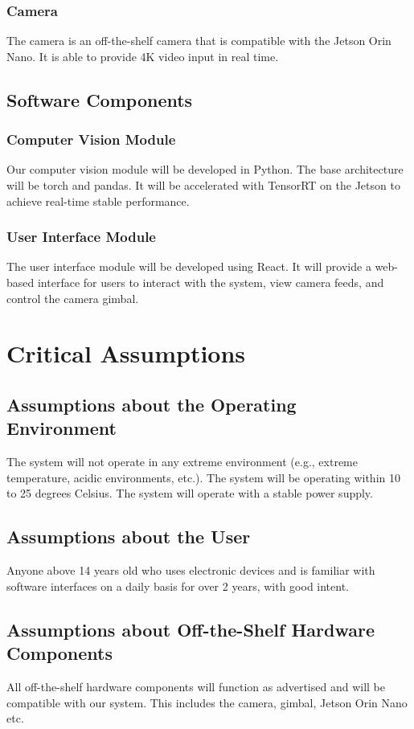 \documentclass{article}
\begin{document}
\subsubsection{Camera}
The camera is an off-the-shelf camera that is compatible with the Jetson Orin
Nano. It is able to provide 4K video input in real time.

\subsection{Software Components}
\subsubsection{Computer Vision Module}
Our computer vision module will be developed in Python. The base architecture
will be torch and pandas. It will be accelerated with TensorRT on the Jetson to
achieve real-time stable performance.
\subsubsection{User Interface Module}
The user interface module will be developed using React. It will provide a
web-based interface for users to interact with the system, view camera feeds,
and control the camera gimbal.

\section{Critical Assumptions}

\subsection{Assumptions about the Operating Environment}
The system will not operate in any extreme environment (e.g., extreme
temperature, acidic environments, etc.). The system will be operating within 10
to 25 degrees Celsius. The system will operate with a stable power supply.
\subsection{Assumptions about the User}
Anyone above 14 years old who uses electronic devices and is familiar with
software interfaces on a daily basis for over 2 years, with good intent.
\subsection{Assumptions about Off-the-Shelf Hardware Components}
All off-the-shelf hardware components will function as advertised and will be
compatible with our system. This includes the camera, gimbal, Jetson Orin Nano
etc.
\end{document}
